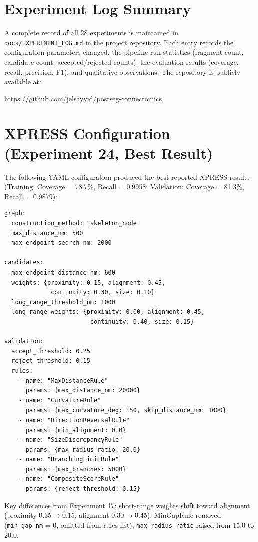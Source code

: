 \section{Experiment Log Summary}

A complete record of all 28 experiments is maintained in
\texttt{docs/EXPERIMENT\_LOG.md} in the project repository. Each entry
records the configuration parameters changed, the pipeline run statistics
(fragment count, candidate count, accepted/rejected counts), the evaluation
results (coverage, recall, precision, F1), and qualitative observations.
The repository is publicly available at:

\begin{center}
\url{https://github.com/jelsayyid/postseg-connectomics}
\end{center}

\section{XPRESS Configuration (Experiment 24, Best Result)}

The following YAML configuration produced the best reported XPRESS results
(Training: Coverage = 78.7\%, Recall = 0.9958; Validation: Coverage = 81.3\%,
Recall = 0.9879):

\begin{verbatim}
graph:
  construction_method: "skeleton_node"
  max_distance_nm: 500
  max_endpoint_search_nm: 2000

candidates:
  max_endpoint_distance_nm: 600
  weights: {proximity: 0.15, alignment: 0.45,
             continuity: 0.30, size: 0.10}
  long_range_threshold_nm: 1000
  long_range_weights: {proximity: 0.00, alignment: 0.45,
                        continuity: 0.40, size: 0.15}

validation:
  accept_threshold: 0.25
  reject_threshold: 0.15
  rules:
    - name: "MaxDistanceRule"
      params: {max_distance_nm: 20000}
    - name: "CurvatureRule"
      params: {max_curvature_deg: 150, skip_distance_nm: 1000}
    - name: "DirectionReversalRule"
      params: {min_alignment: 0.0}
    - name: "SizeDiscrepancyRule"
      params: {max_radius_ratio: 20.0}
    - name: "BranchingLimitRule"
      params: {max_branches: 5000}
    - name: "CompositeScoreRule"
      params: {reject_threshold: 0.15}
\end{verbatim}

Key differences from Experiment 17: short-range weights shift toward alignment
(proximity 0.35$\to$0.15, alignment 0.30$\to$0.45); MinGapRule removed
(\texttt{min\_gap\_nm} = 0, omitted from rules list); \texttt{max\_radius\_ratio}
raised from 15.0 to 20.0.

